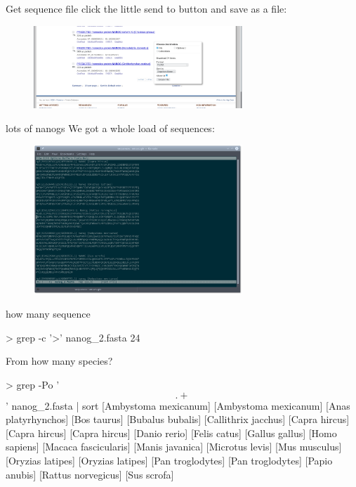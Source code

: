 \documentclass[pdf]{beamer}
\begin{document}
\begin{frame}{Get sequence file}
  click the little send to button and save as a file:
  \begin{figure}[ht]
    \includegraphics[width=0.7\textwidth]{images/ncbi_nanog_send_to}
  \end{figure}
\end{frame}

\begin{frame}{lots of nanogs}
  We got a whole load of sequences:
  \begin{figure}[ht]
    \includegraphics[width=0.7\textwidth]{images/nanog_multiple_fasta}
  \end{figure}
\end{frame}

\begin{frame}[fragile]{how many sequence}
  \begin{consolecode}
    > grep -c '>' nanog_2.fasta 
    24
  \end{consolecode}
  
  From how many species?
  \begin{consolecode}
    > grep -Po '\[.+\]' nanog_2.fasta | sort
    [Ambystoma mexicanum]
    [Ambystoma mexicanum]
    [Anas platyrhynchos]
    [Bos taurus]
    [Bubalus bubalis]
    [Callithrix jacchus]
    [Capra hircus]
    [Capra hircus]
    [Capra hircus]
    [Danio rerio]
    [Felis catus]
    [Gallus gallus]
    [Homo sapiens]
    [Macaca fascicularis]
    [Manis javanica]
    [Microtus levis]
    [Mus musculus]
    [Oryzias latipes]
    [Oryzias latipes]
    [Pan troglodytes]
    [Pan troglodytes]
    [Papio anubis]
    [Rattus norvegicus]
    [Sus scrofa]
  \end{consolecode}
\end{frame}
\end{document}
